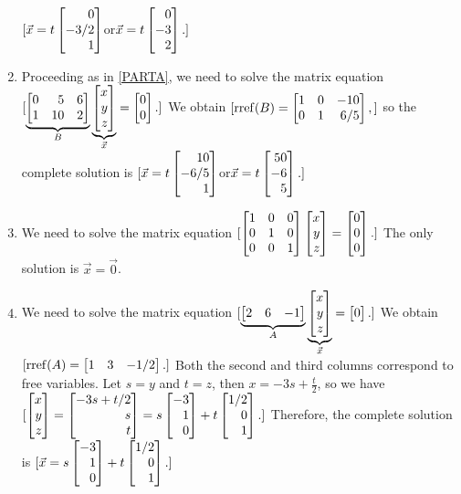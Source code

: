 \begin{exercises}
\begin{problist}
\begin{solution}
\begin{enumerate}
				$[
					\vec x = t\mat{0\\-3/2\\1} $\quad$ \text{or} $\quad$ \vec x = t\mat{0\\-3\\2}.
				]$
				\item  Proceeding as in \ref{PARTA}, we need to solve the matrix equation
				$[
					\underbrace{\mat{0&5&6\\1&10&2} }_{B} \underbrace{\mat{x\\y\\z}}_{\vec{x}} = \mat{0\\0}.
				]$
				We obtain
				$[
					\rref (B) = \mat{1&0&-10\\0&1&6/5},
				]$
				so the complete solution is 
				$[
					\vec x = t\mat{10\\-6/5\\1} $\quad$ \text{or} $\quad$ \vec x = t\mat{50\\-6\\5}.
				]$


				\item We need to solve the matrix equation
				$[
					\mat{1&0&0\\0&1&0\\0&0&1} \mat{x\\y\\z} = \mat{0\\0\\0}.
				]$
				The only solution is $\vec x = \vec 0$.


				\item We need to solve the matrix equation
				$[
					\underbrace{\mat{2&6&-1} }_{A} \underbrace{\mat{x\\y\\z}}_{\vec x} = \mat{0}.
				]$
				We obtain
				$[
					\rref (A) = \mat{1&3&-1/2}.
				]$
				Both the second and third columns correspond to free variables. Let $s=y$ and $t=z$, then $x = -3s + \frac{t}{2}$, so we have
				$[
					\mat{x\\y\\z} = \mat{-3s+t/2\\s\\t} = s\mat{-3\\1\\0} + t\mat{1/2\\0\\1}.
				]$
				Therefore, the complete solution is
				$[
					\vec x = s\mat{-3\\1\\0} + t\mat{1/2\\0\\1}.
				]$
			\end{enumerate}
		\end{solution}	


\end{problist}
\end{exercises}
